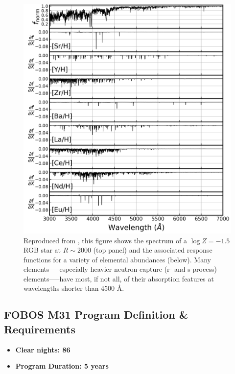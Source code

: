 \documentclass[11pt,a4paper,twoside,onecolumn,openany,final,oldfontcommands]{memoir}
\begin{document}
\begin{figure}
\includegraphics[width=1.0\textwidth]{figs/BlueFeatures_Sandford_2020_fig18.pdf}
\caption[Importance of blue abundance-indicating spectral features]{Reproduced from \citet{Sandford20}, this figure shows the spectrum of a $\log{Z} = -1.5$ RGB star at $R \sim 2000$ (top panel) and the associated response functions for a variety of elemental abundances (below).  Many elements—--especially heavier neutron-capture (r- and s-process) elements—--have most, if not all, of their absorption features at wavelengths shorter than 4500 \AA{}.}
\label{fig:abundances_blue}
\end{figure}


\subsection{FOBOS M31 Program Definition \& Requirements}

\medskip
\begin{itemize}[leftmargin=0.3in, itemsep=0pt]
	\item[] \textbf{Clear nights: 86}
	\item[] \textbf{Program Duration: 5 years}
\end{itemize}
\end{document}

